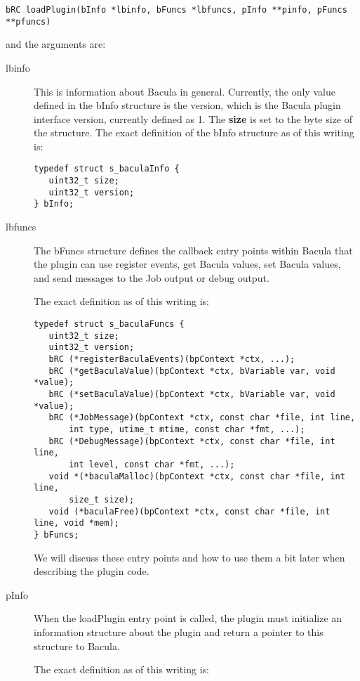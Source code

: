 \begin{verbatim}
bRC loadPlugin(bInfo *lbinfo, bFuncs *lbfuncs, pInfo **pinfo, pFuncs **pfuncs)
\end{verbatim}

and the arguments are:

\begin{description}
\item [lbinfo]
This is information about Bacula in general. Currently, the only value
defined in the bInfo structure is the version, which is the Bacula plugin
interface version, currently defined as 1.  The {\bf size} is set to the
byte size of the structure. The exact definition of the bInfo structure
as of this writing is:

\begin{verbatim}
typedef struct s_baculaInfo {
   uint32_t size;
   uint32_t version;
} bInfo;
\end{verbatim}

\item [lbfuncs]
The bFuncs structure defines the callback entry points within Bacula
that the plugin can use register events, get Bacula values, set
Bacula values, and send messages to the Job output or debug output.

The exact definition as of this writing is:
\begin{verbatim}
typedef struct s_baculaFuncs {
   uint32_t size;
   uint32_t version;
   bRC (*registerBaculaEvents)(bpContext *ctx, ...);
   bRC (*getBaculaValue)(bpContext *ctx, bVariable var, void *value);
   bRC (*setBaculaValue)(bpContext *ctx, bVariable var, void *value);
   bRC (*JobMessage)(bpContext *ctx, const char *file, int line,
       int type, utime_t mtime, const char *fmt, ...);
   bRC (*DebugMessage)(bpContext *ctx, const char *file, int line,
       int level, const char *fmt, ...);
   void *(*baculaMalloc)(bpContext *ctx, const char *file, int line,
       size_t size);
   void (*baculaFree)(bpContext *ctx, const char *file, int line, void *mem);
} bFuncs;
\end{verbatim}

We will discuss these entry points and how to use them a bit later when
describing the plugin code.


\item [pInfo]
When the loadPlugin entry point is called, the plugin must initialize
an information structure about the plugin and return a pointer to
this structure to Bacula.

The exact definition as of this writing is:


\end{description}
